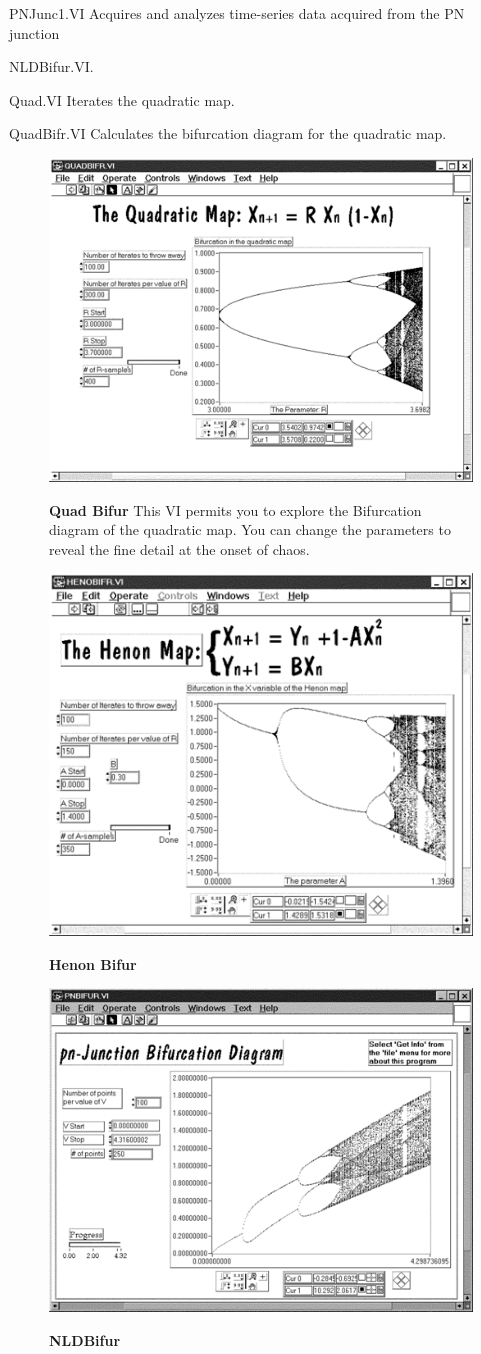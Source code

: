 \documentclass{../lab}
\begin{document}
PNJunc1.VI Acquires and analyzes time-series data acquired from the PN junction

NLDBifur.VI.

Quad.VI Iterates the quadratic map.

QuadBifr.VI Calculates the bifurcation diagram for the quadratic map.

\begin{figure}[h]
    \centering
    \href{http://experimentationlab.berkeley.edu/sites/default/files/images/Nldimage138.gif}{\includegraphics[width=0.6\linewidth]{images/Nldimage138.png}}
    \caption{\textbf{Quad Bifur} This VI permits you to explore the Bifurcation diagram of the quadratic map. You can change the parameters to reveal the fine detail at the onset of chaos.}
\end{figure}

\begin{figure}[h]
    \centering
    \href{http://experimentationlab.berkeley.edu/sites/default/files/images/Nldimage139.gif}{\includegraphics[width=0.5\linewidth]{images/Nldimage139.png}}
    \caption{\textbf{Henon Bifur}}
\end{figure}

\begin{figure}[h]
    \centering
    \href{http://experimentationlab.berkeley.edu/sites/default/files/images/Nldimage140.gif}{\includegraphics[width=0.5\linewidth]{images/Nldimage140.png}}
    \caption{\textbf{NLDBifur}}
\end{figure}
\end{document}
